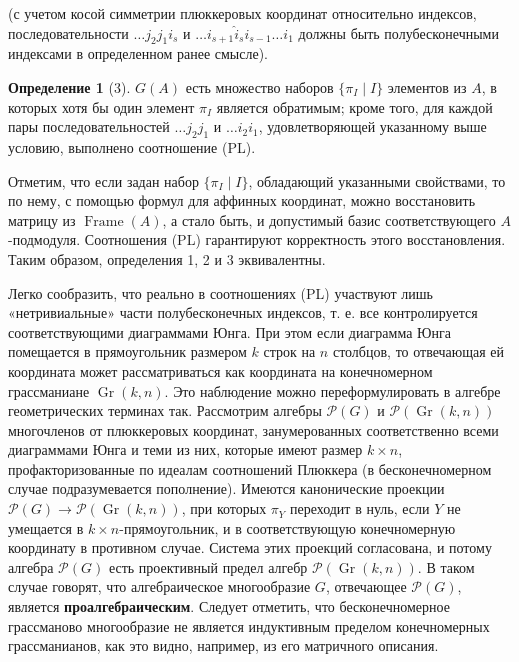 \documentclass{article}
\theoremstyle{definition}
\theoremstyle{definition} %
\newtheorem{definition}{Определение}[section]
\theoremstyle{remark}     %
\theoremstyle{definition}
\theoremstyle{definition}
\theoremstyle{definition}
\theoremstyle{definition}
\theoremstyle{definition}
\theoremstyle{definition}
\theoremstyle{definition}
\theoremstyle{definition}
\begin{document}
(с учетом косой симметрии плюккеровых координат относительно индексов, последовательности \( \dots j_2 j_1 i_s \) и \( \dots i_{s+1} \hat{i}_s i_{s-1} \dots i_1 \) должны быть полубесконечными индексами в определенном ранее смысле).

\begin{definition}[3]
  \( G(A) \) есть множество наборов \( \{ \pi_I \mid I \} \) элементов из \( A \), в которых хотя бы один элемент \( \pi_I \) является обратимым; кроме того, для каждой пары последовательностей \( \dots j_2 j_1 \) и \( \dots i_2 i_1 \), удовлетворяющей указанному выше условию, выполнено соотношение (PL).
\end{definition}

Отметим, что если задан набор \( \{ \pi_I \mid I \} \), обладающий указанными свойствами, то по нему, с помощью формул для аффинных координат, можно восстановить матрицу из \(\operatorname{Frame}(A)\), а стало быть, и допустимый базис соответствующего \(A\)-подмодуля. Соотношения (PL) гарантируют корректность этого восстановления. Таким образом, определения 1, 2 и 3 эквивалентны.

Легко сообразить, что реально в соотношениях (PL) участвуют лишь «нетривиальные» части полубесконечных индексов, т. е. все контролируется соответствующими диаграммами Юнга. При этом если диаграмма Юнга помещается в прямоугольник размером \(k\) строк на \(n\) столбцов, то отвечающая ей координата может рассматриваться как координата на конечномерном грассманиане \(\operatorname{Gr}(k, n)\). Это наблюдение можно переформулировать в алгебре геометрических терминах так. Рассмотрим алгебры \(\mathcal{P}(G)\) и \(\mathcal{P}(\operatorname{Gr}(k, n))\) многочленов от плюккеровых координат, занумерованных соответственно всеми диаграммами Юнга и теми из них, которые имеют размер \(k \times n\), профакторизованные по идеалам соотношений Плюккера (в бесконечномерном случае подразумевается пополнение). Имеются канонические проекции \(\mathcal{P}(G) \to \mathcal{P}(\operatorname{Gr}(k, n))\), при которых \(\pi_Y\) переходит в нуль, если \(Y\) не умещается в \(k \times n\)-прямоугольник, и в соответствующую конечномерную координату в противном случае. Система этих проекций согласована, и потому алгебра \(\mathcal{P}(G)\) есть проективный предел алгебр \(\mathcal{P}(\operatorname{Gr}(k, n))\). В таком случае говорят, что алгебраическое многообразие \(G\), отвечающее \(\mathcal{P}(G)\), является \textbf{проалгебраическим}. Следует отметить, что бесконечномерное грассманово многообразие не является индуктивным пределом конечномерных грассманианов, как это видно, например, из его матричного описания.
\end{document}
